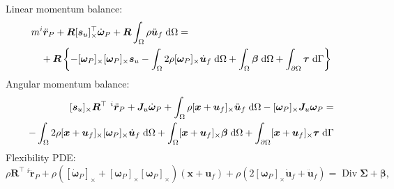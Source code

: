 \documentclass{svjour3}                     %
\DeclareMathOperator*{\Div}{Div}
\newcommand{\crmat}[1]{\ensuremath{[#1]_{\times}}}
\begin{document}
Linear momentum balance:
\begin{equation}
\begin{split}
&m ^{i}\ddot{\bm{r}}_P + \bm{R} \crmat{\bm{s}_u}^\top \dot{\bm{\omega}}_P  + \bm{R} \int_{\Omega} \rho \ddot{\bm{u}}_f \d{\Omega} = \\
&\quad + \bm{R} \left\{ -\crmat{\bm{\omega}_P} \crmat{\bm{\omega}_P} \bm{s}_u -  \int_{\Omega} 2 \rho \crmat{\bm{\omega}_P} \dot{\bm{u}}_f \d{\Omega} +  \int_{\Omega} \bm\beta \d{\Omega} +  \int_{\partial \Omega} \bm\tau \d{\Gamma}  \right\} 
\end{split}
\end{equation}
Angular momentum balance:
\begin{equation}
\begin{split}
\crmat{\bm{s}_u} {\bm{R}^{\top}} \ ^{i}\ddot{\bm{r}}_P + \bm{J}_u \dot{\bm\omega}_P + \int_{\Omega} \rho \crmat{\bm{x}+\bm{u}_f} \ddot{\bm{u}}_f \d{\Omega} - \crmat{\bm{\omega}_P} \bm{J}_u \bm{\omega}_P = \\ 
- \int_{\Omega} 2\rho \crmat{\bm{x}+\bm{u}_f} \crmat{\bm\omega_P} \dot{\bm{u}}_f \d{\Omega} + \int_{\Omega}\crmat{\bm{x}+\bm{u}_f} \bm\beta \d{\Omega} + \int_{\partial \Omega}\crmat{\bm{x}+\bm{u}_f} \bm\tau \d{\Gamma} \\
\end{split}
\end{equation}
Flexibility PDE:
\begin{equation}
\rho  {\bm{R}^{\top}} \ ^{i}\ddot{\bm{r}}_P + \rho (\crmat{\dot{\bm\omega}_P} + \crmat{\bm{\omega}_P}\crmat{\bm{\omega}_P})(\bm{x}+\bm{u}_f) + \rho (2 \crmat{\bm{\omega}_P} \dot{\bm{u}}_f + \ddot{\bm{u}}_f) = \Div{\bm\Sigma} + \bm\beta,
\end{equation}
%
 

\end{document}
